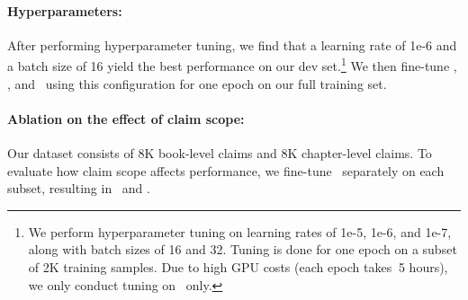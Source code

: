 \paragraph{Hyperparameters:} After performing hyperparameter tuning, we find that a learning rate of 1e-6 and a batch size of 16 yield the best performance on our dev set.\footnote{We perform hyperparameter tuning on learning rates of 1e-5, 1e-6, and 1e-7, along with batch sizes of 16 and 32. Tuning is done for one epoch on a subset of 2K training samples. Due to high GPU costs (each epoch takes $~$5 hours), we only conduct tuning on \prolongbase\ only.} We then fine-tune \qweninst, \llamainst, and \prolongbase\ using this configuration for one epoch on our full training set.


\paragraph{Ablation on the effect of claim scope:} Our dataset consists of 8K book-level claims and 8K chapter-level claims. To evaluate how claim scope affects performance, we fine-tune \prolongbase\ separately on each subset, resulting in \prolongftchapter\ and \prolongftbook.


